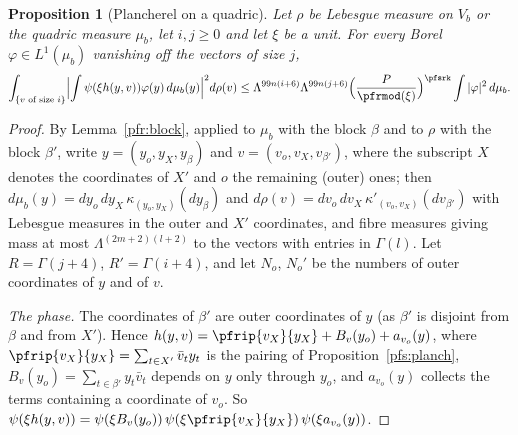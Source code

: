 \documentclass[10pt]{amsart}
\newtheorem{proposition}[theorem]{Proposition}
\theoremstyle{definition}
\theoremstyle{remark}
\begin{document}
\begin{proposition}[Plancherel on a quadric]\label{pfs:quadplanch}
Let $\rho$ be Lebesgue measure on $V_b$ or the quadric measure $\mu_b$, let $i,j\ge0$ and let $\xi$ be a unit.
For every Borel $\varphi\in L^1(\mu_b)$ vanishing off the vectors of size $j$,
\[
\int_{\{v\text{ of size }i\}}\Bigl|\int\psi(\xi h(y,v))\varphi(y)\,d\mu_b(y)\Bigr|^2d\rho(v)\le
\Lambda^{99n(i+6)}\Lambda^{99n(j+6)}\Bigl(\frac P{\pfrmod(\xi)}\Bigr)^{\pfsrk}\int|\varphi|^2\,d\mu_b .
\]
\end{proposition}
\begin{proof}
By Lemma~\ref{pfr:block}, applied to $\mu_b$ with the block $\beta$ and to $\rho$ with the block $\beta'$, write
$y=(y_o,y_X,y_\beta)$ and $v=(v_o,v_X,v_{\beta'})$, where the subscript $X$ denotes the coordinates of $X'$ and
$o$ the remaining (outer) ones; then $d\mu_b(y)=dy_o\,dy_X\,\kappa_{(y_o,y_X)}(dy_\beta)$ and
$d\rho(v)=dv_o\,dv_X\,\kappa'_{(v_o,v_X)}(dv_{\beta'})$ with Lebesgue measures in the outer and $X'$ coordinates,
and fibre measures giving mass at most $\Lambda^{(2m+2)(l+2)}$ to the vectors with entries in $\Gamma(l)$. Let
$R=\Gamma(j+4)$, $R'=\Gamma(i+4)$, and let $N_o$, $N_o'$ be the numbers of outer coordinates of $y$ and of $v$.

\emph{The phase.} The coordinates of $\beta'$ are outer coordinates of $y$ (as $\beta'$ is disjoint from $\beta$ and
from $X'$). Hence $h(y,v)=\pfrip{v_X}{y_X}+B_v(y_o)+a_{v_o}(y)$, where $\pfrip{v_X}{y_X}=\sum_{t\in X'}\bar v_ty_t$ is
the pairing of Proposition~\ref{pfs:planch}, $B_v(y_o)=\sum_{t\in\beta'}y_t\bar v_t$
depends on $y$ only through $y_o$, and $a_{v_o}(y)$ collects the terms containing a coordinate of $v_o$. So
$\psi(\xi h(y,v))=\psi(\xi B_v(y_o))\,\psi(\xi\pfrip{v_X}{y_X})\,\psi(\xi a_{v_o}(y))$.


\end{proof}
\end{document}
